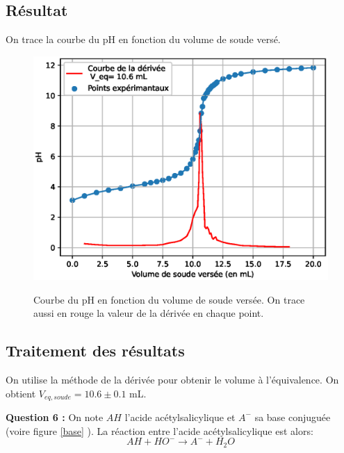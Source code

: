 \documentclass[12pt]{article}
\begin{document}
\newpage
	\subsection{Résultat}
On trace la courbe du pH en fonction du volume de soude versé. 
\begin{figure}[h!]
	\begin{center}
		\includegraphics[scale=0.6]{Titrage_2.eps}
		\label{Titrage2}
		\caption{Courbe du pH en fonction du volume de soude versée. On trace aussi en rouge la valeur de la dérivée en chaque point.}
	\end{center}
\end{figure}

\newpage
	\subsection{Traitement des résultats}
On utilise la méthode de la dérivée pour obtenir le volume à l'équivalence. On obtient $V_{eq,soude}=10.6\pm 0.1$ mL.

\textbf{Question 6 :} On note $AH$ l'acide acétylsalicylique et $A^-$ sa base conjuguée (voire figure \ref{base} ). La réaction entre l'acide acétylsalicylique est alors:
\begin{equation}
AH + HO^- \longrightarrow A^- + H_2O
\label{Acidebase}
\end{equation}
\end{document}
